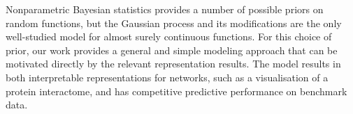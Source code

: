 Nonparametric Bayesian statistics provides a number of possible priors on random functions, but the Gaussian process
and its modifications are the only well-studied model for almost surely continuous functions.
For this choice of prior, our work provides a general and simple modeling approach that can be motivated directly by the
relevant representation results.
The model results in both interpretable representations for networks, such as a visualisation of a protein interactome, and has 
competitive predictive performance on benchmark data.






\outbpdocument{


}
